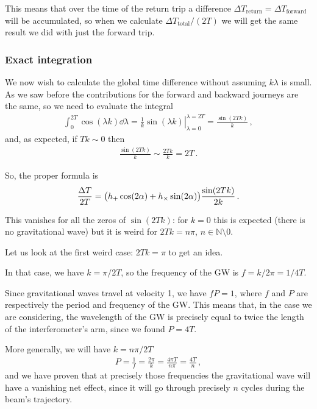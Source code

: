 \documentclass[main.tex]{subfiles}
\begin{document}
This means that over the time of the return trip a difference \(\Delta T _{\text{return}} = \Delta T _{\text{forward}}\) will be accumulated, so when we calculate \(\Delta T _{\text{total}} / (2T)\) we will get the same result we did with just the forward trip. 

\subsubsection{Exact integration}

We now wish to calculate the global time difference without assuming \(k \lambda \) is small. As we saw before the contributions for the forward and backward journeys are the same, so we need to evaluate the integral 
%
\begin{align}
\int_{0}^{2T} \cos(\lambda k) \dd{\lambda } 
= \left. \frac{1}{k} \sin(\lambda k ) \right\vert_{\lambda = 0}^{\lambda = 2T} = \frac{\sin(2Tk)}{k} 
\,,
\end{align}
%
and, as expected, if \(Tk \sim 0\) then 
%
\begin{align}
\frac{\sin(2Tk)}{k} \sim \frac{2Tk}{k} = 2T
\,.
\end{align}

So, the proper formula is 
%
\begin{align}
\frac{\Delta T}{2T} = 
\qty(h_{+} \cos(2 \alpha ) + h_{ \times } \sin(2 \alpha ))
\frac{\sin(2Tk)}{2k}
\,.
\end{align}

This vanishes for all the zeros of \(\sin(2Tk)\): for \(k=0\) this is expected (there is no gravitational wave) but it is weird for \(2Tk = n \pi \), \(n \in \mathbb{N} \setminus \qty{0}\). 

Let us look at the first weird case: \(2Tk = \pi \) to get an idea. 

In that case, we have \(k =  \pi / 2T \), so the frequency of the GW is \(f = k / 2 \pi  =  1/ 4 T\). 

Since gravitational waves travel at velocity 1, we have \(fP = 1\), where \(f\) and \(P\) are respectively the period and frequency of the GW. 
This means that, in the case we are considering, the wavelength of the GW is precisely equal to twice the length of the interferometer's arm, since we found \(P = 4T\). 

More generally, we will have \(k = n \pi /2T\)
%
\begin{align}
P = \frac{1}{f} = \frac{2 \pi }{k} = \frac{4 \pi T}{n \pi } = \frac{4T}{n}
\,,
\end{align}
%
and we have proven that at precisely those frequencies the gravitational wave will have a vanishing net effect, since it will go through precisely \(n\) cycles during the beam's trajectory. 

\end{document}

